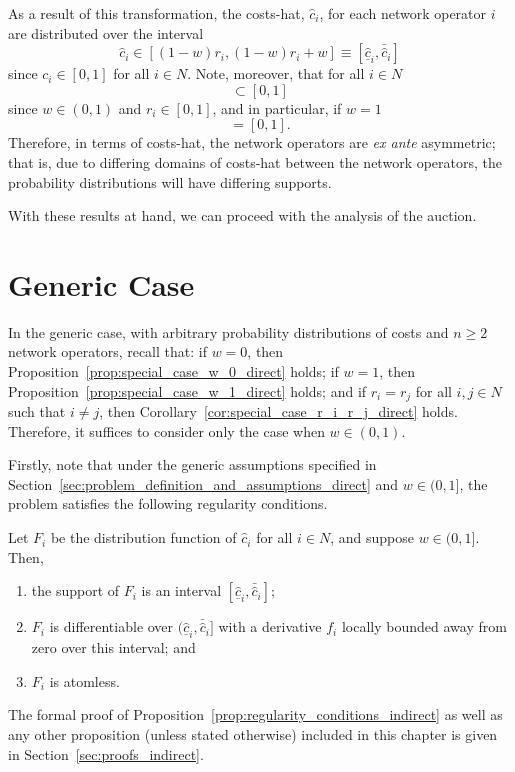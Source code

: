 As a result of this transformation, the costs-hat, $\hat{c}_i$, for each network operator $i$ are distributed over the interval
\begin{equation*}
  \hat{c}_i\in [(1-w)r_i, (1-w)r_i + w]\equiv [\underline{\hat{c}}_i, \bar{\hat{c}}_i]
\end{equation*}
since $c_i\in [0,1]$ for all $i\in N$. Note, moreover, that for all $i\in N$
\begin{equation*}
  [\underline{\hat{c}}_i, \bar{\hat{c}}_i] \subset [0,1]
\end{equation*}
since $w\in (0,1)$ and $r_i\in [0,1]$, and in particular, if $w=1$
\begin{equation*}
  [\underline{\hat{c}}_i, \bar{\hat{c}}_i] = [0,1].
\end{equation*}
Therefore, in terms of costs-hat, the network operators are \emph{ex ante} asymmetric; that is, due to differing domains of costs-hat between the network operators, the probability distributions will have differing supports.

With these results at hand, we can proceed with the analysis of the auction.

\section{Generic Case} %
\label{sec:generic_case_indirect}
In the generic case, with arbitrary probability distributions of costs and $n\ge 2$ network operators, recall that: if $w=0$, then Proposition~\ref{prop:special_case_w_0_direct} holds; if $w=1$, then Proposition~\ref{prop:special_case_w_1_direct} holds; and if $r_i=r_j$ for all $i,j\in N$ such that $i\neq j$, then Corollary~\ref{cor:special_case_r_i_r_j_direct} holds. Therefore, it suffices to consider only the case when $w\in (0,1)$.

Firstly, note that under the generic assumptions specified in Section~\ref{sec:problem_definition_and_assumptions_direct} and $w\in (0,1]$, the problem satisfies the following regularity conditions.
\begin{proposition}
\label{prop:regularity_conditions_indirect}
Let $F_i$ be the distribution function of $\hat{c}_i$ for all $i\in N$, and suppose $w\in (0,1]$. Then,
\begin{enumerate}
  \item the support of $F_i$ is an interval ${[\underline{\hat{c}}_i, \bar{\hat{c}}_i]}$;
  \item $F_i$ is differentiable over ${(\underline{\hat{c}}_i, \bar{\hat{c}}_i]}$ with a derivative $f_i$ locally bounded away from zero over this interval; and
  \item $F_i$ is atomless.
\end{enumerate}
\end{proposition}
\noindent The formal proof of Proposition~\ref{prop:regularity_conditions_indirect} as well as any other proposition (unless stated otherwise) included in this chapter is given in Section~\ref{sec:proofs_indirect}.


